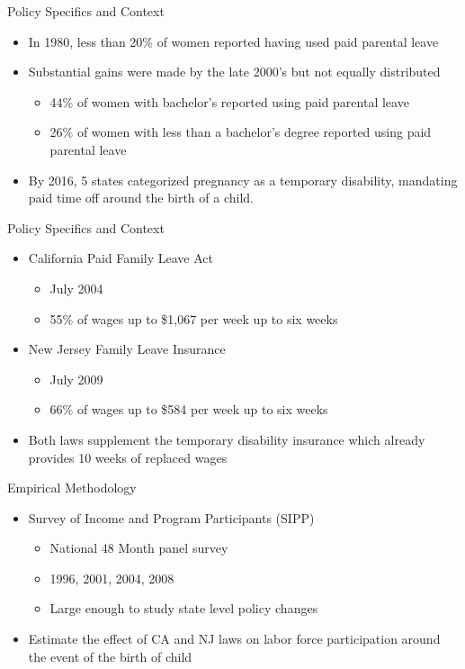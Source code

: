 \documentclass{beamer}
\begin{document}
\begin{frame}{Policy Specifics and Context}
	\begin{itemize}
	\item
	 In 1980, less than 20\% of women reported having used paid parental leave
	\item
	 Substantial gains were made by the late 2000's but not equally distributed
	\begin{itemize}
	\item 44\% of women with bachelor's reported using paid parental leave
	\item 26\% of women with less than a bachelor's degree reported using paid parental leave
	\end{itemize}
	\item
		 By 2016, 5 states categorized pregnancy as a temporary disability, mandating paid time off around the birth of a child.
	\end{itemize}
	
\end{frame}

\begin{frame}{Policy Specifics and Context}
	\begin{itemize}
	\item
	 California Paid Family Leave Act
	\begin{itemize}
	\item
	 July 2004
	\item
	 55\% of wages up to \$1,067 per week up to six weeks
	\end{itemize}
	\item
	 New Jersey Family Leave Insurance
	\begin{itemize}
	\item
	 July 2009
	\item
	 66\% of wages up to \$584 per week up to six weeks
	\end{itemize}
	\item
	 Both laws supplement the temporary disability insurance which already provides 10 weeks of replaced wages
	\end{itemize}
\end{frame}

\begin{frame}{Empirical Methodology}
	\begin{itemize}		
	\item
	 Survey of Income and Program Participants (SIPP)
	\begin{itemize}
		\item
		 National 48 Month panel survey
		\item
		 1996, 2001, 2004, 2008
		\item
		 Large enough to study state level policy changes
	\end{itemize}
	\item
	  Estimate the effect of CA and NJ laws on labor force participation around the event of the birth of child
	 \end{itemize}
\end{frame}
\end{document}
